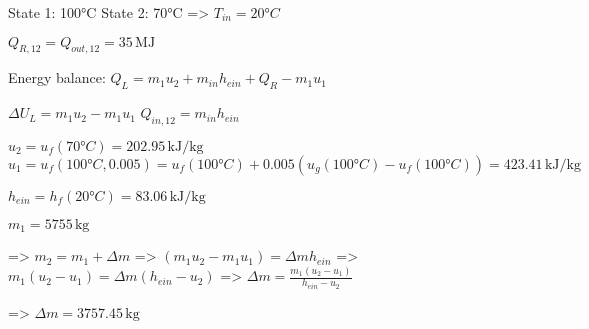State 1: 100°C  
State 2: 70°C  
=> \( T_{in} = 20°C \)  

\( Q_{R,12} = Q_{out,12} = 35 \, \text{MJ} \)  

Energy balance:  
\( Q_{L} = m_{1} u_{2} + m_{in} h_{ein} + Q_{R} - m_{1} u_{1} \)  

\( \Delta U_{L} = m_{1} u_{2} - m_{1} u_{1} \)  
\( Q_{in,12} = m_{in} h_{ein} \)  

\( u_{2} = u_{f}(70°C) = 202.95 \, \text{kJ/kg} \)  
\( u_{1} = u_{f}(100°C, 0.005) = u_{f}(100°C) + 0.005 (u_{g}(100°C) - u_{f}(100°C)) = 423.41 \, \text{kJ/kg} \)  

\( h_{ein} = h_{f}(20°C) = 83.06 \, \text{kJ/kg} \)  

\( m_{1} = 5755 \, \text{kg} \)  

=> \( m_{2} = m_{1} + \Delta m \)  
=> \( (m_{1} u_{2} - m_{1} u_{1}) = \Delta m h_{ein} \)  
=> \( m_{1} (u_{2} - u_{1}) = \Delta m (h_{ein} - u_{2}) \)  
=> \( \Delta m = \frac{m_{1} (u_{2} - u_{1})}{h_{ein} - u_{2}} \)  

=> \( \Delta m = 3757.45 \, \text{kg} \)